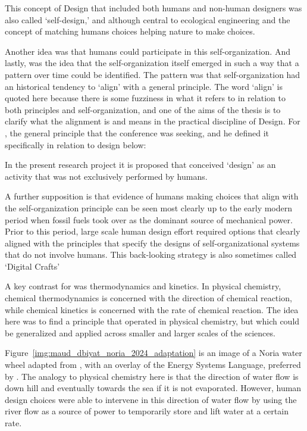 \documentclass[a4paper,12pt]{article}
\begin{document}
This concept of Design that included both humans and non-human designers was also called `self-design,' and although central to ecological engineering and the concept of matching humans choices helping nature to make choices.




Another idea was that humans could participate in this self-organization. And lastly, was the idea that the self-organization itself emerged in such a way that a pattern over time could be identified. The pattern was that self-organization had an historical tendency to `align' with a general principle. The word `align' is quoted here because there is some fuzziness in what it refers to in relation to both principles and self-organization, and one of the aims of the thesis is to clarify what the alignment is and means in the practical discipline of Design. For \citeauthor{odum_emergy_1991}, the general principle that the conference was seeking, and he defined it specifically in relation to design below:


In the present research project it is proposed that \citeauthor{odum_emergy_1991} conceived `design' as an activity that was not exclusively performed by humans. 

A further supposition is that evidence of humans making choices that align with the self-organization principle can be seen most clearly up to the early modern period when fossil fuels took over as the dominant source of mechanical power. Prior to this period, large scale human design effort required options that clearly aligned with the principles that specify the designs of self-organizational systems that do not involve humans. This back-looking strategy is also sometimes called `Digital Crafts'   







 
A key contrast for \citeauthor{odum_emergy_1991} was thermodynamics and kinetics. In physical chemistry, chemical thermodynamics is concerned with the direction of chemical reaction, while chemical kinetics is concerned with the rate of chemical reaction. The idea here was to find a principle that operated in physical chemistry, but which could be generalized and applied across smaller and larger scales of the sciences. 

Figure~\ref{img:maud_dbiyat_noria_2024_adaptation} is an image of a Noria water wheel adapted from \citet[Fig.~2]{dbiyat_norias_2019},  with an overlay of the Energy Systems Language, preferred by \citeauthor{odum_emergy_1991}. The analogy to physical chemistry here is that the direction of water flow is down hill and eventually towards the sea if it is not evaporated. However, human design choices were able to intervene in this direction of water flow by using the river flow as a source of power to temporarily store and lift water at a certain rate.
\end{document}
